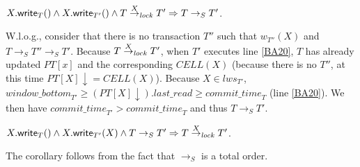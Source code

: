 \begin{lemma}
\label{lemma:lock}
$X.{\sf write}_T()  \wedge X.{\sf write}_{T'}() 
 \wedge T \stackrel{X}{\rightarrow}_{\mathit{lock}} T' \Rightarrow T \rightarrow_S T'$.
\end{lemma}
\begin{proofL}
W.l.o.g., consider that there is no transaction $T''$ such that 
$w_{T''}(X)$ and $T \rightarrow_S T'' \rightarrow_S T'$. 
Because $T \stackrel{X}{\rightarrow}_{\mathit{lock}} T'$, when $T'$
executes line \ref{BA20}, 
$T$ has already updated 
$PT[x]$ and the corresponding $\mathit{CELL}(X)$ (because there is no $T''$,
at this time $PT[X] \downarrow = \mathit{CELL}(X)$). Because $X \in lws_{T'}$,
$\mathit{window\_bottom}_{T'} \geq (PT[X] \downarrow).\mathit{last\_read} 
\geq \mathit{commit\_time}_{T}$ (line \ref{BA20}). We then have 
$\mathit{commit\_time}_{T'} > \mathit{commit\_time}_{T}$ and thus
$T \rightarrow_S T'$.
\renewcommand{\toto}{lemma:lock}
\end{proofL}

\begin{corollary}
\label{coro:lock}
$X.{\sf write}_T()  \wedge X.{\sf write}_{T'}(X) 
\wedge T \rightarrow_S T' \Rightarrow T \stackrel{X}{\rightarrow}_{\mathit{lock}} T'$.
\end{corollary}
\begin{proofC}
The corollary follows from the fact that $\rightarrow_S$ is a total order.
\renewcommand{\toto}{coro:lock}
\end{proofC}

